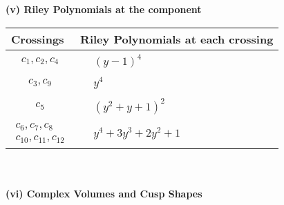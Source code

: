 \documentclass[1p]{elsarticle_modified}
\theoremstyle{definition}
\begin{document}
\newpage\renewcommand{\arraystretch}{1}
\flushleft \textbf{(v) Riley Polynomials at the component}\newline \\
\begin{tabular}{m{50pt}|m{274pt}}
Crossings & \hspace{64pt}Riley Polynomials at each crossing \\
\hline $$\begin{aligned}c_{1},c_{2},c_{4}\end{aligned}$$&$\begin{aligned}
&(y-1)^4
\end{aligned}$\\
\hline $$\begin{aligned}c_{3},c_{9}\end{aligned}$$&$\begin{aligned}
&y^4
\end{aligned}$\\
\hline $$\begin{aligned}c_{5}\end{aligned}$$&$\begin{aligned}
&(y^2+y+1)^2
\end{aligned}$\\
\hline $$\begin{aligned}c_{6},c_{7},c_{8}\\c_{10},c_{11},c_{12}\end{aligned}$$&$\begin{aligned}
&y^4+3 y^3+2 y^2+1
\end{aligned}$\\
\hline
\end{tabular}\\~\\
\newpage\flushleft \textbf{(vi) Complex Volumes and Cusp Shapes}
\end{document}
